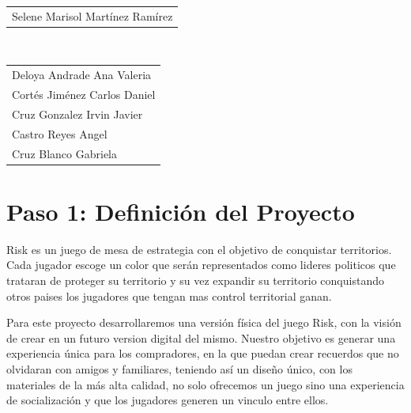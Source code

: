 \documentclass[12pt]{article}
\begin{document}
\begin{titlepage}
\begin{center}
\begin{tabular}{l}
\large Selene Marisol Martínez Ramírez \\[0.5cm]
\end{tabular}

\\[0.6cm]
\color{black}
\centering
\begin{tabular}{l}


\large Deloya Andrade Ana Valeria \\[0.4cm]

\large   Cortés Jiménez Carlos Daniel \\[0.4cm]

\large  Cruz Gonzalez Irvin Javier \\[0.4cm]

\large  Castro Reyes Angel  \\[0.4cm]

\large   Cruz Blanco Gabriela \\[0.4cm]
\end{tabular}

\vfill

\end{center}
\end{titlepage}

 \section*{Paso 1: Definición del Proyecto}

  Risk es un juego de mesa de estrategia con el objetivo de conquistar territorios. Cada jugador escoge un color que serán representados como lideres politicos que trataran de proteger su territorio y su vez expandir su territorio conquistando otros paises los jugadores que tengan mas control territorial ganan.

  Para este proyecto desarrollaremos una versión física del juego Risk, con la visión de crear en un futuro version digital del mismo. Nuestro objetivo es generar una experiencia única para los compradores, en la que puedan crear recuerdos que no olvidaran con amigos y familiares, teniendo así un diseño único, con los materiales de la más alta calidad, no solo ofrecemos un juego sino una experiencia de socialización y que los jugadores generen un vinculo entre ellos.
\end{document}
